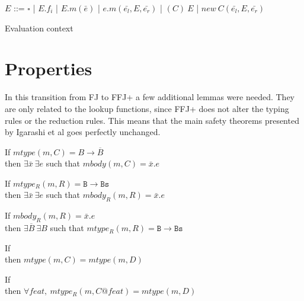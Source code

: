 \begin{table}[h!]
    \centering
    $E$ ::= $\square$ | $E.f_i$ | $E.m(\bar{e})$ | $e.m(\bar{e_l}, E, \bar{e_r})$
    | $(C)~E$ | $new~C(\bar{e_l}, E, \bar{e_r})$
    \label{table:eval-ctx}
    \caption{Evaluation context}
\end{table}

\section{Properties}
In this transition from \gls{FJ} to \gls{FFJ+} a few additional lemmas were needed.
They are only related to the lookup functions, since \gls{FFJ+} does not alter
the typing rules or the reduction rules. This means that the main safety theorems
presented by Igarashi et al \cite{igarashi_featherweight_2001} goes 
perfectly unchanged.

\begin{theorem}
    If $mtype(m, C) = B \rightarrow \overline{B}$ \\
    then $\exists \bar{x}~\exists e$ such that
        $mbody(m, C) = \bar{x}. e$
\end{theorem}

\begin{theorem}
    If $mtype_R(m, R) = \mathtt{B} \rightarrow \mathtt{Bs}$ \\
    then $\exists \bar{x}~\exists e$ such that
        $mbody_R(m, R) = \bar{x}. e$
\end{theorem}

\begin{theorem}
    If $mbody_R(m, R) = \bar{x} . e $ \\
    then $\exists \overline{B}~\exists B$ such that
        $mtype_R(m, R) = \mathtt{B} \rightarrow \mathtt{Bs}$
\end{theorem}

\begin{theorem}
    If  \\
    then $mtype(m, C) = mtype(m, D)$        
\end{theorem}

\begin{theorem}
    If  \\
        then $\forall feat,~mtype_R(m, C@feat) = mtype(m, D)$        
\end{theorem}

